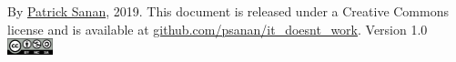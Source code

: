 \documentclass{article}
\begin{document}
\vspace{10pt}
\begin{center}
{\small
By \href{https://www.patricksanan.com}{Patrick Sanan}, 2019.
This document is released under a Creative Commons license
and is available at \url{github.com/psanan/it_doesnt_work}.
Version 1.0\\
\vspace{10pt}
\includegraphics[width=50px]{by-nc-sa.png}
}
\end{center}
\end{document}
